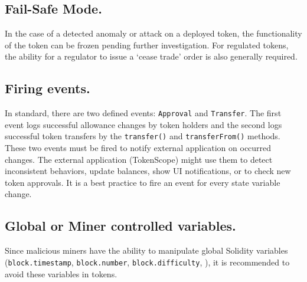 \subsection{Fail-Safe Mode.}\label{subsec:failsf}

In the case of a detected anomaly or attack on a deployed \erc token, the functionality of the token can be frozen pending further investigation. For regulated tokens, the ability for a regulator to issue a `cease trade' order is also generally required. 

\subsection{Firing events.}\label{subsec:evnts}

In \erc standard, there are two defined events: \texttt{Approval} and \texttt{Transfer}. The first event logs successful allowance changes by token holders and the second logs successful token transfers by the \texttt{transfer()} and \texttt{transferFrom()} methods. These two events must be fired to notify external application on occurred changes. The external application (\eg TokenScope\cite{TokenScope}) might use them to detect inconsistent behaviors, update balances, show UI notifications, or to check new token approvals. It is a best practice to fire an event for every state variable change.

\subsection{Global or Miner controlled variables.}\label{subsec:miner}

Since malicious miners have the ability to manipulate global Solidity variables (\eg \texttt{block.timestamp}, \texttt{block.number}, \texttt{block.difficulty}, \etc), it is recommended to avoid these variables in \erc tokens.

%

